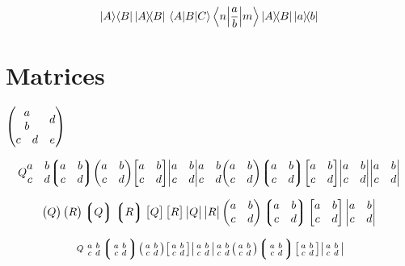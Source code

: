 \documentclass{article}
\begin{document}
\[
  \left\vert A \middle\rangle\middle\langle B\right\vert
  \ketbra{A}{B}
  \mel A B C
  \mel**{n}{\frac{a}{b}}{m}
  \outerproduct{A}{B}
  \dyad{a}{b}
\]


\newpage


\section*{Matrices}

$
\begin{pmatrix}
  \mqty{a\\b} & d\\
  \mqty{c & d} & e
\end{pmatrix}
$


\[
  \matrixquantity{Q}
  \matrixquantity*{a & b \\ c & d}
  \matrixquantity*(a & b \\ c & d)
  \matrixquantity(a & b \\ c & d)
  \matrixquantity[a & b \\ c & d]
  \matrixquantity|a & b \\ c & d|
  \mqty{a & b \\ c & d}
  \mqty(a & b \\ c & d)
  \mqty*(a & b \\ c & d)
  \mqty[a & b \\ c & d]
  \mqty|a & b \\ c & d|
  \mqty*|a & b\\ c& d|
\]

\[
  \pmqty{Q} \mqty(R)
  \Pmqty{Q} \mqty*(R)
  \bmqty{Q} \mqty[R]
  \vmqty{Q} \mqty|R|
  \pmqty{a & b \\ c & d}
  \Pmqty{a & b \\ c & d}
  \bmqty{a & b \\ c & d}
  \vmqty{a & b \\ c & d}
\]

\[
  \smallmatrixquantity{Q}
  \smallmatrixquantity*{a & b \\ c & d}
  \smallmatrixquantity*(a & b \\ c & d)
  \smallmatrixquantity(a & b \\ c & d)
  \smallmatrixquantity[a & b \\ c & d]
  \smallmatrixquantity|a & b \\ c & d|
  \smqty{a & b \\ c & d}
  \smqty(a & b \\ c & d)
  \smqty*(a & b \\ c & d)
  \smqty[a & b \\ c & d]
  \smqty|a & b \\ c & d|
\]
\end{document}

